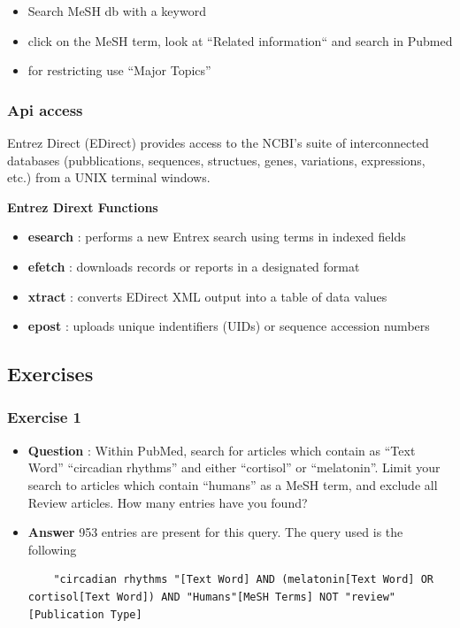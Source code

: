 \documentclass[11pt]{article}
\begin{document}
\begin{itemize}
\item Search MeSH db with a keyword
\item click on the MeSH term, look at “Related information`` and search in Pubmed
\item for restricting use ``Major Topics''
\end{itemize}


\subsubsection{Api access}
\label{sec:org41c1f18}
Entrez Direct (EDirect) provides access to the NCBI's suite of interconnected databases
(pubblications, sequences, structues, genes, variations, expressions, etc.) from a 
UNIX terminal windows.

\textbf{Entrez Dirext Functions}\\
\begin{itemize}
\item \textbf{esearch} : performs a new Entrex search using terms in indexed fields
\item \textbf{efetch} : downloads records or reports in a designated format
\item \textbf{xtract} : converts EDirect XML output into a table of data values
\item \textbf{epost} : uploads unique indentifiers (UIDs) or sequence accession numbers
\end{itemize}


\subsection{Exercises}
\label{sec:orgdaf7bfb}
\subsubsection{Exercise 1}
\label{sec:org92ff3a2}
\begin{itemize}
\item \textbf{Question} : Within PubMed, search for articles which contain as ``Text Word''
``circadian rhythms'' and either ``cortisol'' or ``melatonin''. Limit your search to
articles which contain ``humans'' as a MeSH term, and exclude all Review
articles. How many entries have you found?
\item \textbf{Answer}
953 entries are present for this query.
The query used is the following
\begin{verbatim}
    "circadian rhythms "[Text Word] AND (melatonin[Text Word] OR cortisol[Text Word]) AND "Humans"[MeSH Terms] NOT "review"[Publication Type]
\end{verbatim}
\end{itemize}
\end{document}
